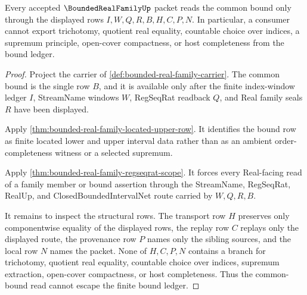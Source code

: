 \begin{theorem}
\label{thm:bounded-real-family-bound-ledger-nonescape}
Every accepted $\BoundedRealFamilyUp$ packet reads the common bound only through the displayed rows $I,W,Q,R,B,H,C,P,N$. In particular, a consumer cannot export trichotomy, quotient real equality, countable choice over indices, a supremum principle, open-cover compactness, or host completeness from the bound ledger.
\end{theorem}
\begin{proof}
Project the carrier of \autoref{def:bounded-real-family-carrier}. The common bound is the single row $B$, and it is available only after the finite index-window ledger $I$, StreamName windows $W$, RegSeqRat readback $Q$, and Real family seals $R$ have been displayed.

Apply \autoref{thm:bounded-real-family-located-upper-row}. It identifies the bound row as finite located lower and upper interval data rather than as an ambient order-completeness witness or a selected supremum.

Apply \autoref{thm:bounded-real-family-regseqrat-scope}. It forces every Real-facing read of a family member or bound assertion through the StreamName, RegSeqRat, RealUp, and ClosedBoundedIntervalNet route carried by $W,Q,R,B$.

It remains to inspect the structural rows. The transport row $H$ preserves only componentwise equality of the displayed rows, the replay row $C$ replays only the displayed route, the provenance row $P$ names only the sibling sources, and the local row $N$ names the packet. None of $H,C,P,N$ contains a branch for trichotomy, quotient real equality, countable choice over indices, supremum extraction, open-cover compactness, or host completeness. Thus the common-bound read cannot escape the finite bound ledger.
\end{proof}

